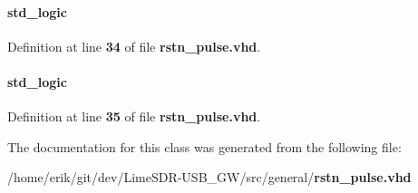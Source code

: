 \paragraph[{resetn\+\_\+in\+\_\+reg1}]{ {\bfseries \textcolor{comment}{std\+\_\+logic}\textcolor{vhdlchar}{ }} \hspace{0.3cm}{\ttfamily [Signal]}}\label{classrstn__pulse_1_1arch_a2d9909ab801dc9fde6abf5686df5f716}


Definition at line {\bf 34} of file {\bf rstn\+\_\+pulse.\+vhd}.

\paragraph[{resetn\+\_\+in\+\_\+reg2}]{ {\bfseries \textcolor{comment}{std\+\_\+logic}\textcolor{vhdlchar}{ }} \hspace{0.3cm}{\ttfamily [Signal]}}\label{classrstn__pulse_1_1arch_abb20a8d944a937e3f1185cdecdcf2d8d}


Definition at line {\bf 35} of file {\bf rstn\+\_\+pulse.\+vhd}.



The documentation for this class was generated from the following file\+:\begin{DoxyCompactItemize}
\item 
/home/erik/git/dev/\+Lime\+S\+D\+R-\/\+U\+S\+B\+\_\+\+G\+W/src/general/{\bf rstn\+\_\+pulse.\+vhd}\end{DoxyCompactItemize}
